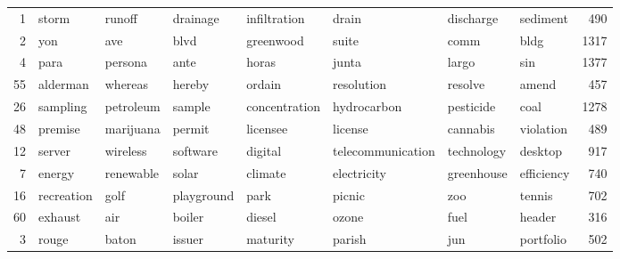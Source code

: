 \begin{table}[ht]
\begin{tabular}{rlllllllr}
    1 & \cellcolor{red!10}storm & \cellcolor{red!10}runoff & \cellcolor{red!10}drainage & \cellcolor{red!10}infiltration & \cellcolor{red!10}drain & \cellcolor{red!10}discharge & \cellcolor{red!10}sediment & 490 \\ 
    2 & \cellcolor{red!10}yon & \cellcolor{red!10}ave & \cellcolor{red!10}blvd & \cellcolor{red!10}greenwood & \cellcolor{red!10}suite & \cellcolor{red!10}comm & \cellcolor{red!10}bldg & 1317 \\ 
    4 & \cellcolor{red!10}para & \cellcolor{red!10}persona & \cellcolor{red!10}ante & \cellcolor{red!10}horas & \cellcolor{red!10}junta & \cellcolor{red!10}largo & \cellcolor{red!10}sin & 1377 \\ 
   55 & \cellcolor{red!10}alderman & \cellcolor{red!10}whereas & \cellcolor{red!10}hereby & \cellcolor{red!10}ordain & \cellcolor{red!10}resolution & \cellcolor{red!10}resolve & \cellcolor{red!10}amend & 457 \\ 
   26 & \cellcolor{red!10}sampling & \cellcolor{red!10}petroleum & \cellcolor{red!10}sample & \cellcolor{red!10}concentration & \cellcolor{red!10}hydrocarbon & \cellcolor{red!10}pesticide & \cellcolor{red!10}coal & 1278 \\ 
   48 & \cellcolor{red!10}premise & \cellcolor{red!10}marijuana & \cellcolor{red!10}permit & \cellcolor{red!10}licensee & \cellcolor{red!10}license & \cellcolor{red!10}cannabis & \cellcolor{red!10}violation & 489 \\ 
   12 & \cellcolor{red!10}server & \cellcolor{red!10}wireless & \cellcolor{red!10}software & \cellcolor{red!10}digital & \cellcolor{red!10}telecommunication & \cellcolor{red!10}technology & \cellcolor{red!10}desktop & 917 \\ 
    7 & \cellcolor{red!10}energy & \cellcolor{red!10}renewable & \cellcolor{red!10}solar & \cellcolor{red!10}climate & \cellcolor{red!10}electricity & \cellcolor{red!10}greenhouse & \cellcolor{red!10}efficiency & 740 \\ 
   16 & \cellcolor{white}recreation & \cellcolor{white}golf & \cellcolor{white}playground & \cellcolor{white}park & \cellcolor{white}picnic & \cellcolor{white}zoo & \cellcolor{white}tennis & 702 \\ 
   60 & \cellcolor{white}exhaust & \cellcolor{white}air & \cellcolor{white}boiler & \cellcolor{white}diesel & \cellcolor{white}ozone & \cellcolor{white}fuel & \cellcolor{white}header & 316 \\ 
    3 & \cellcolor{white}rouge & \cellcolor{white}baton & \cellcolor{white}issuer & \cellcolor{white}maturity & \cellcolor{white}parish & \cellcolor{white}jun & \cellcolor{white}portfolio & 502 \\ 

\end{tabular}
\end{table}
